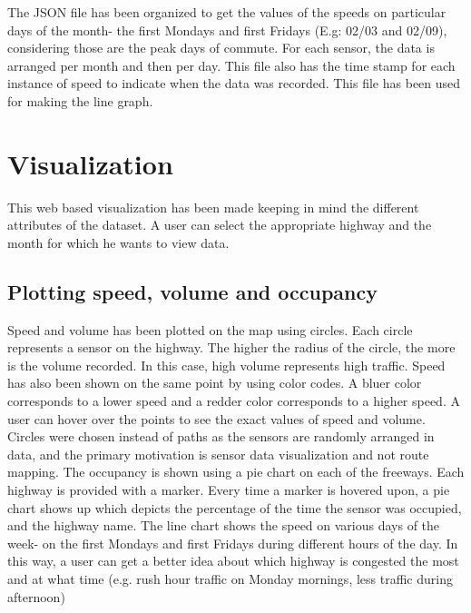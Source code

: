 \documentclass{llncs}
\begin{document}
The JSON file has been organized to get the values of the speeds on particular days of the month- the first Mondays and first Fridays (E.g: 02/03 and 02/09), considering those are the peak days of commute. For each sensor, the data is arranged per month and then per day. This file also has the time stamp for each instance of speed to indicate when the data was recorded. This file has been used for making the line graph. 

\section{Visualization}\label{sec:Visualization}

This web based visualization has been made keeping in mind the different attributes of the dataset. A user can select the appropriate highway and the month for which he wants to view data. 

\subsection {Plotting speed, volume and occupancy}\label{sec:Plotting speed, volume and occupancy}

Speed and volume has been plotted on the map using circles. Each circle represents a sensor on the highway. The higher the radius of the circle, the more is the volume recorded. In this case, high volume represents high traffic. Speed has also been shown on the same point by using color codes. A bluer color corresponds to a lower speed and a redder color corresponds to a higher speed. A user can hover over the points to see the exact values of speed and volume. Circles were chosen instead of paths as the sensors are randomly arranged in data, and the primary motivation is sensor data visualization and not route mapping. 
The occupancy is shown using a pie chart on each of the freeways. Each highway is provided with a marker. Every time a marker is hovered upon, a pie chart shows up which depicts the percentage of the time the sensor was occupied, and the highway name. 
The line chart shows the speed on various days of the week- on the first Mondays and first Fridays during different hours of the day. In this way, a user can get a better idea about which highway is congested the most and at what time (e.g. rush hour traffic on Monday mornings, less traffic during afternoon)

\end{document}
